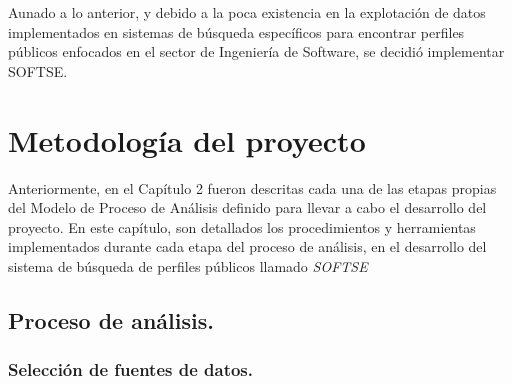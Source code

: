 Aunado a lo anterior, y debido a la poca existencia en la explotación de datos implementados en sistemas de búsqueda específicos para encontrar perfiles públicos enfocados en el sector de Ingeniería de Software, se decidió implementar SOFTSE.
%
%
%






\chapter{Metodología del proyecto}
\label{chap:enf}

Anteriormente, en el Capítulo 2 fueron descritas cada una de las etapas propias del Modelo de Proceso de Análisis definido para llevar a cabo el desarrollo del proyecto. En este capítulo, son detallados los procedimientos y herramientas implementados durante cada etapa del proceso de análisis, en el desarrollo del sistema de búsqueda de perfiles públicos llamado \textit{SOFTSE}

\section{Proceso de análisis.}
\label{sec:sec04}



\subsection{Selección de fuentes de datos.}
\label{subsec:subsec04}

